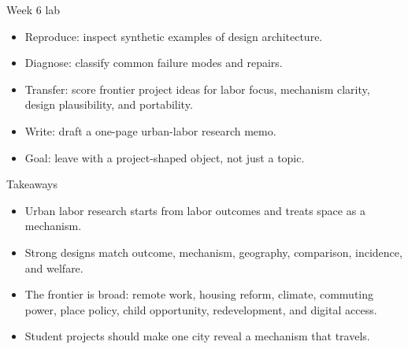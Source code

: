 \documentclass[aspectratio=169,11pt]{beamer}
\begin{document}
\begin{frame}{Week 6 lab}
\begin{itemize}
    \item Reproduce: inspect synthetic examples of design architecture.
    \item Diagnose: classify common failure modes and repairs.
    \item Transfer: score frontier project ideas for labor focus, mechanism clarity, design plausibility, and portability.
    \item Write: draft a one-page urban-labor research memo.
    \item Goal: leave with a project-shaped object, not just a topic.
\end{itemize}
\end{frame}

\begin{frame}{Takeaways}
\begin{itemize}
    \item Urban labor research starts from labor outcomes and treats space as a mechanism.
    \item Strong designs match outcome, mechanism, geography, comparison, incidence, and welfare.
    \item The frontier is broad: remote work, housing reform, climate, commuting power, place policy, child opportunity, redevelopment, and digital access.
    \item Student projects should make one city reveal a mechanism that travels.
\end{itemize}
\end{frame}
\end{document}
